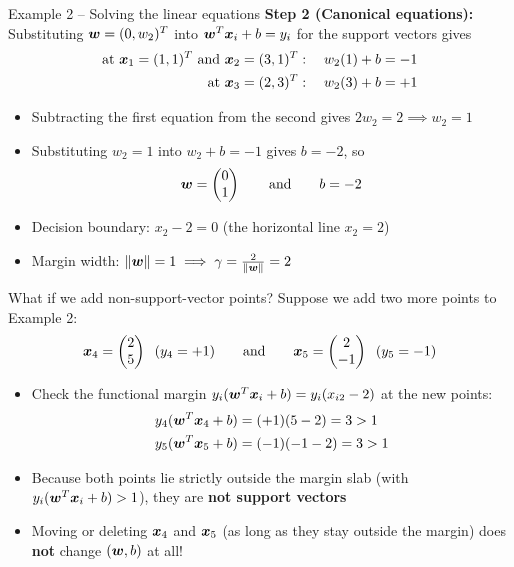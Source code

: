 \documentclass[aspectratio=169]{beamer}\usepackage[]{graphicx}\usepackage[]{xcolor}
\begin{document}
\begin{frame}{Example 2 -- Solving the linear equations}
    \textbf{Step 2 (Canonical equations):} Substituting $\bm{w} = (0, w_2)^T$ into $\bm{w}^T \bm{x}_i + b = y_i$ for the support vectors gives
    \begin{align*}
        \text{at } \bm{x}_1 = (1, 1)^T \text{ and } \bm{x}_2 = (3, 1)^T: \quad w_2(1) + b &= -1 \\
        \text{at } \bm{x}_3 = (2, 3)^T: \quad w_2(3) + b &= +1
    \end{align*}
    \vfill
    \begin{itemize}
        \item Subtracting the first equation from the second gives $2w_2 = 2 \implies w_2 = 1$
        \item Substituting $w_2 = 1$ into $w_2 + b = -1$ gives $b = -2$, so
        \[
            \bm{w} = \begin{pmatrix} 0 \\ 1 \end{pmatrix} \qquad \text{and} \qquad b = -2
        \]
        \item Decision boundary: $x_2 - 2 = 0$ (the horizontal line $x_2 = 2$)
        \item Margin width: $\|\bm{w}\| = 1 \implies \gamma = \frac{2}{\|\bm{w}\|} = 2$
    \end{itemize}
\end{frame}


\begin{frame}{What if we add non-support-vector points?}
    Suppose we add two more points to Example 2:
    \[
        \bm{x}_4 = \begin{pmatrix} 2 \\ 5 \end{pmatrix} \;\; (y_4 = +1) \qquad \text{and} \qquad \bm{x}_5 = \begin{pmatrix} 2 \\ -1 \end{pmatrix} \;\; (y_5 = -1)
    \]
    \vfill
    \begin{itemize}
        \item Check the functional margin $y_i(\bm{w}^T \bm{x}_i + b) = y_i(x_{i2} - 2)$ at the new points:
        \begin{align*}
            y_4(\bm{w}^T \bm{x}_4 + b) &= (+1)(5 - 2) = 3 > 1 \\
            y_5(\bm{w}^T \bm{x}_5 + b) &= (-1)(-1 - 2) = 3 > 1
        \end{align*}
        \vfill
        \item Because both points lie strictly outside the margin slab (with $y_i(\bm{w}^T \bm{x}_i + b) > 1$), they are \textbf{not support vectors}
        \vfill
        \item Moving or deleting $\bm{x}_4$ and $\bm{x}_5$ (as long as they stay outside the margin) does \textbf{not} change $(\bm{w}, b)$ at all!
    \end{itemize}
\end{frame}
\end{document}

